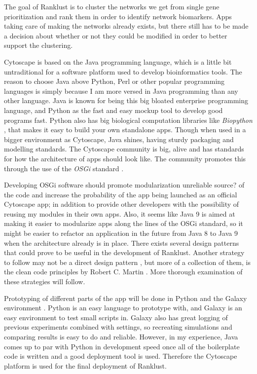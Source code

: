 \documentclass[UKenglish]{ifimaster}
\begin{document}
The goal of Ranklust is to cluster the networks we get from single gene prioritization and rank them in order to 
identify network biomarkers. Apps taking care of making the networks already exists, but there still has to be made a 
decision about whether or not they could be modified in order to better support the clustering.

Cytoscape is based on the Java programming language, which is a little bit
untraditional for a software platform used to develop bioinformatics tools. 
The reason to choose Java above Python, Perl or other popular programming
languages is simply because I am more versed in Java programming than any other
language. Java is known for being this big bloated enterprise programming
language, and Python as the fast and easy mockup tool to develop good programs
fast. Python also has big biological computation libraries like \emph{Biopython}
\cite{biopython}, that makes it easy to build your own standalone apps. Though
when used in a bigger environment as Cytoscape, Java shines, having sturdy
packaging and modelling standards. The Cytoscape community is big, alive and has
standards for how the architecture of apps should look like. The community
promotes this through the use of the \emph{OSGi} standard \cite{cytoscape-osgi}.

Developing OSGi software should promote modularization \cite{modularization} %
unreliable source?  of the code and increase the probability of the app being
launched as an official Cytoscape app; in addition to provide other developers
with the possibility of reusing my modules in their own apps. Also, it seems
like Java 9 is aimed at making it easier to modularize apps along the lines of
the OSGi standard, so it might be easier to refactor an application in the
future from Java 8 to Java 9 when the architecture already is in place. There
exists several design patterns that could prove to be useful in the development
of Ranklust. Another strategy to follow may not be a direct design pattern
\cite{designpattern}, but more of a collection of them, is the clean code
principles by Robert C. Martin \cite{cleancode}. More thorough examination of
these strategies will follow.

Prototyping of different parts of the app will be done in Python and the Galaxy
environment \cite{galaxy}. Python is an easy language to prototype with, and
Galaxy is an easy environment to test small scripts in. Galaxy also has great
logging of previous experiments combined with settings, so recreating
simulations and comparing results is easy to do and reliable. However, in my
experience, Java comes up to par with Python in development speed once all of
the boilerplate code is written and a good deployment tool is used. Therefore
the Cytoscape platform is used for the final deployment of Ranklust.
\end{document}
